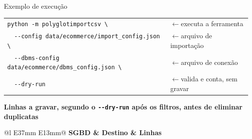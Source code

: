 \begin{frame}[fragile]{Exemplo de execução}
  \begin{tcolorbox}[colback=ufscfundo, colframe=ufscborda, boxrule=0.5pt, arc=0.6mm,
      boxsep=0pt, left=2mm, right=2mm, top=0.6mm, bottom=0.6mm]
    \footnotesize
    \begin{tabular}{@{}l@{\hspace{6mm}}l@{}}
      \lstinline[style=bashgrande]|python -m polyglotimportcsv \|
        & {\color{black!60}$\leftarrow$}\enspace executa a ferramenta \\
      \lstinline[style=bashgrande]|  --config data/ecommerce/import_config.json \|
        & {\color{black!60}$\leftarrow$}\enspace arquivo de importação \\
      \lstinline[style=bashgrande]|  --dbms-config data/ecommerce/dbms_config.json \|
        & {\color{black!60}$\leftarrow$}\enspace arquivo de conexão \\
      \lstinline[style=bashgrande]|  --dry-run|
        & {\color{black!60}$\leftarrow$}\enspace valida e conta, sem gravar \\
    \end{tabular}
  \end{tcolorbox}
  \par\smallskip
  \par\vspace{-2mm}\begingroup\footnotesize\bfseries\color{ufscazul} Linhas a gravar, segundo o
  \texttt{-{}-dry-run}\hfill\scriptsize\mdseries\color{black!60}
  após os filtros, antes de eliminar duplicatas\par\endgroup
  \scriptsize
  \setlength{\tabcolsep}{3pt}
  \setlength{\aboverulesep}{0.15ex}\setlength{\belowrulesep}{0.3ex}
  \begin{minipage}[t]{0.49\textwidth}
    \begin{tabular}[t]{@{}l E{37mm} E{13mm}@{}}
      \toprule
      \bfseries SGBD & \bfseries Destino & \bfseries Linhas \\

\end{tabular}
\end{minipage}
\end{frame}
